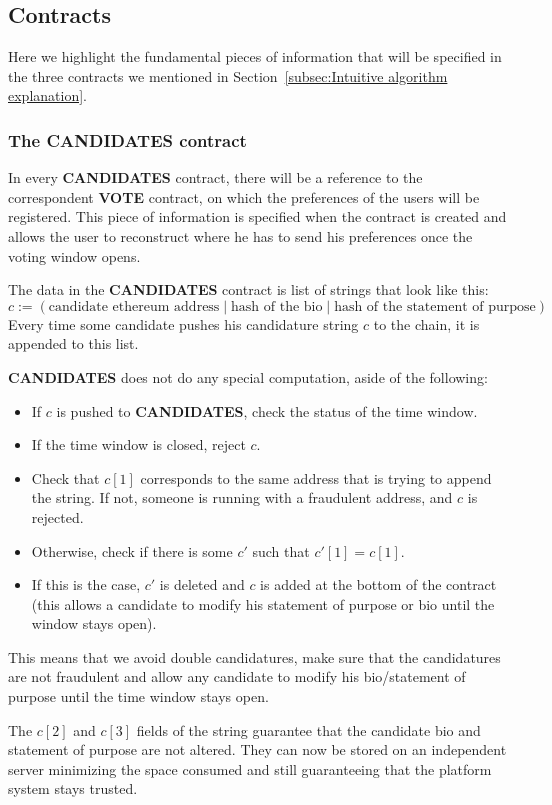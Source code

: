\documentclass[submission, copyright,creativecommons,sharealike,noncommercial]{eptcs}
\newcommand{\Candidates}{\textbf{CANDIDATES}\xspace}
\newcommand{\Vote}{\textbf{VOTE}\xspace}
\begin{document}
\subsection{Contracts}\label{subsec:Contracts}
%
Here we highlight the fundamental pieces of information that will be specified in the three contracts we mentioned in Section~\ref{subsec:Intuitive algorithm explanation}.
\subsubsection{The \Candidates contract}
	In every \Candidates contract, there will be a reference to the correspondent \Vote contract, on which the preferences of the users will be registered. This piece of information is specified when the contract is created and allows the user to reconstruct where he has to send his preferences once the voting window opens.
	
	The data in the \Candidates contract is list of strings that look like this: 
	\[
		c := (\text{candidate ethereum address} \mid \text{hash of the bio} \mid \text{hash of the statement of purpose})
	\]
	Every time some candidate pushes his candidature string $c$ to the chain, it is appended to this list. 
	
	\Candidates does not do any special computation, aside of the following:
	\begin{itemize}
		\item If $c$ is pushed to \Candidates, check the status of the time window.
		\item If the time window is closed, reject $c$.
		\item Check that $c[1]$ corresponds to the same address that is trying to append the string. If not, someone is running with a fraudulent address, and $c$ is rejected.
		\item Otherwise, check if there is some $c'$ such that $c'[1] = c[1]$.
		\item If this is the case, $c'$ is deleted and $c$ is added at the bottom of the contract (this allows a candidate to modify his statement of purpose or bio until the window stays open).
	\end{itemize}
%
	This means that we avoid double candidatures, make sure that the candidatures are not fraudulent and allow any candidate to modify his bio/statement of purpose until the time window stays open.

	The $c[2]$ and $c[3]$ fields of the string guarantee that the candidate bio and statement of purpose are not altered. They can now be stored on an independent server minimizing the space consumed and still guaranteeing that the platform system stays trusted.	 
%
%
\end{document}
